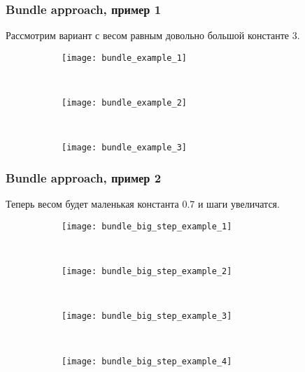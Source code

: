 \documentclass[smaller,unicode,hyperref={unicode=true}]{beamer}
\begin{document}
\begin{frame}
  \frametitle{Bundle approach, пример 1}
    Рассмотрим вариант с весом равным довольно большой константе 3.
    \begin{figure}
      \centering
      \begin{subfigure}[b]{0.45\textwidth}
              \centering
              \texttt{[image: bundle\_example\_1]}
      \end{subfigure}%
      ~ %
      \begin{subfigure}[b]{0.45\textwidth}
              \centering
              \texttt{[image: bundle\_example\_2]}
      \end{subfigure}\\
      \begin{subfigure}[b]{0.45\textwidth}
              \centering
              \texttt{[image: bundle\_example\_3]}
      \end{subfigure}
    \end{figure}
\end{frame}

\begin{frame}
  \frametitle{Bundle approach, пример 2}
    Теперь весом будет маленькая константа 0.7 и шаги увеличатся.
    \begin{figure}
      \centering
      \begin{subfigure}[b]{0.45\textwidth}
              \centering
              \texttt{[image: bundle\_big\_step\_example\_1]}
      \end{subfigure}%
      ~ %
      \begin{subfigure}[b]{0.45\textwidth}
              \centering
              \texttt{[image: bundle\_big\_step\_example\_2]}
      \end{subfigure}\\
      \begin{subfigure}[b]{0.45\textwidth}
              \centering
              \texttt{[image: bundle\_big\_step\_example\_3]}
      \end{subfigure}%
      ~ %
      \begin{subfigure}[b]{0.45\textwidth}
              \centering
              \texttt{[image: bundle\_big\_step\_example\_4]}
      \end{subfigure}
    \end{figure}
\end{frame}
\end{document}
